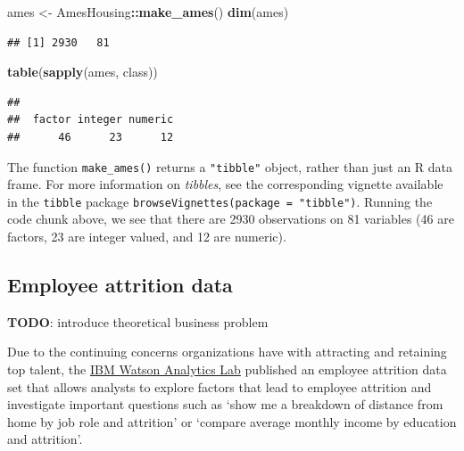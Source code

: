 \documentclass[]{book}
\newenvironment{Shaded}{\begin{snugshade}}{\end{snugshade}}
\newcommand{\KeywordTok}[1]{\textcolor[rgb]{0.13,0.29,0.53}{\textbf{#1}}}
\newcommand{\NormalTok}[1]{#1}
\newcommand{\OperatorTok}[1]{\textcolor[rgb]{0.81,0.36,0.00}{\textbf{#1}}}
\newcommand{\StringTok}[1]{\textcolor[rgb]{0.31,0.60,0.02}{#1}}
\theoremstyle{definition}
\theoremstyle{definition}
\theoremstyle{definition}
\theoremstyle{remark}
\begin{document}
\begin{Shaded}
\begin{Highlighting}[]
\NormalTok{ames <-}\StringTok{ }\NormalTok{AmesHousing}\OperatorTok{::}\KeywordTok{make_ames}\NormalTok{()}
\KeywordTok{dim}\NormalTok{(ames)}
\end{Highlighting}
\end{Shaded}

\begin{verbatim}
## [1] 2930   81
\end{verbatim}

\begin{Shaded}
\begin{Highlighting}[]
\KeywordTok{table}\NormalTok{(}\KeywordTok{sapply}\NormalTok{(ames, class))}
\end{Highlighting}
\end{Shaded}

\begin{verbatim}
## 
##  factor integer numeric 
##      46      23      12
\end{verbatim}

The function \texttt{make\_ames()} returns a \texttt{"tibble"} object,
rather than just an R data frame. For more information on
\emph{tibbles}, see the corresponding vignette available in the
\texttt{tibble} package \citep{R-tibble}
\texttt{browseVignettes(package\ =\ "tibble")}. Running the code chunk
above, we see that there are 2930 observations on 81 variables (46 are
factors, 23 are integer valued, and 12 are numeric).

\hypertarget{employee-attrition-data}{%
\subsection*{Employee attrition data}\label{employee-attrition-data}}

\textbf{TODO}: introduce theoretical business problem

Due to the continuing concerns organizations have with attracting and
retaining top talent, the
\href{https://www.ibm.com/communities/analytics/watson-analytics-blog}{IBM
Watson Analytics Lab} published an employee attrition data set that
allows analysts to explore factors that lead to employee attrition and
investigate important questions such as `show me a breakdown of distance
from home by job role and attrition' or `compare average monthly income
by education and attrition'.
\end{document}

